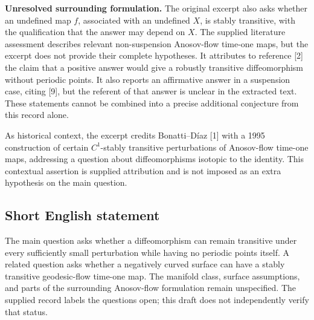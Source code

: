 \documentclass[11pt]{article}
\begin{document}
\textbf{Unresolved surrounding formulation.} The original excerpt also asks whether an undefined map \(f\), associated with an undefined \(X\), is stably transitive, with the qualification that the answer may depend on \(X\). The supplied literature assessment describes relevant non-suspension Anosov-flow time-one maps, but the excerpt does not provide their complete hypotheses. It attributes to reference [2] the claim that a positive answer would give a robustly transitive diffeomorphism without periodic points. It also reports an affirmative answer in a suspension case, citing [9], but the referent of that answer is unclear in the extracted text. These statements cannot be combined into a precise additional conjecture from this record alone.

As historical context, the excerpt credits Bonatti--D\'iaz [1] with a 1995 construction of certain \(C^{1}\)-stably transitive perturbations of Anosov-flow time-one maps, addressing a question about diffeomorphisms isotopic to the identity. This contextual assertion is supplied attribution and is not imposed as an extra hypothesis on the main question.
\subsection{Short English statement}
The main question asks whether a diffeomorphism can remain transitive under every sufficiently small perturbation while having no periodic points itself. A related question asks whether a negatively curved surface can have a stably transitive geodesic-flow time-one map. The manifold class, surface assumptions, and parts of the surrounding Anosov-flow formulation remain unspecified. The supplied record labels the questions open; this draft does not independently verify that status.
\end{document}
